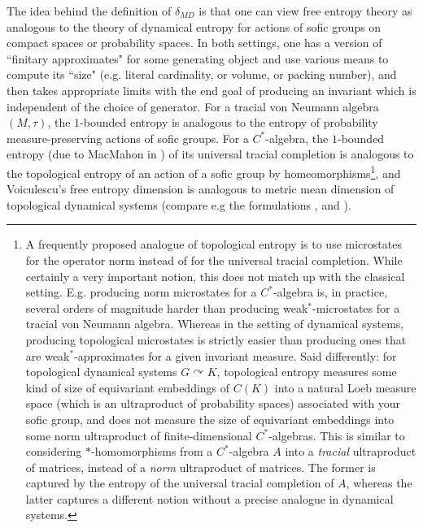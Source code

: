 \documentclass[10pt]{amsart}
\theoremstyle{definition}
\numberwithin{equation}{section}
\DeclareMathOperator{\actson}{\curvearrowright}
\begin{document}
The idea behind the definition of $\delta_{MD}$ is that one can view free entropy theory as analogous to the theory of dynamical entropy for actions of sofic groups on compact spaces or probability spaces. In both settings, one has a version of ``finitary approximates" for some generating object and use various means to compute its ``size" (e.g. literal cardinality, or volume, or packing number), and then takes appropriate limits with the end goal of producing an invariant which is independent of the choice of generator. For a tracial von Neumann algebra $(M,\tau)$, the $1$-bounded entropy is analogous to the entropy of probability measure-preserving actions of sofic groups. For a $C^{*}$-algebra, the $1$-bounded entropy (due to MacMahon in \cite{macmahon20261boundedentropycalgebras}) of its universal tracial completion is analogous to the topological entropy of an action of a sofic group by homeomorphisms\footnote{A frequently proposed analogue of topological entropy is to use microstates for the operator norm instead of for the universal tracial completion. While certainly a very important notion, this does not match up with the classical setting. E.g. producing norm microstates for a $C^{*}$-algebra is, in practice, several orders of magnitude harder than producing weak$^{*}$-microstates for a tracial von Neumann algebra. Whereas in the setting of dynamical systems, producing topological microstates is strictly easier than producing ones that are weak$^{*}$-approximates for a given invariant measure. Said differently: for topological dynamical systems $G\actson K$, topological entropy measures some kind of size of equivariant embeddings of $C(K)$ into a natural Loeb measure space (which is an ultraproduct of probability spaces) associated with your sofic group, and does not measure the size of equivariant embeddings into some norm ultraproduct of finite-dimensional $C^{*}$-algebras. This is similar to considering $*$-homomorphisms from a $C^{*}$-algebra $A$ into a \emph{tracial} ultraproduct of matrices, instead of a \emph{norm} ultraproduct of matrices. The former is captured by the entropy of the universal tracial completion of $A$, whereas the latter captures a different notion without a precise analogue in dynamical systems.}, and
Voiculescu's free entropy dimension is analogous to metric mean dimension of topological dynamical systems (compare e.g the formulations \cite[Section 4]{LindWeiss},\cite[Section 4]{Li}  and \cite[Definition 2.1]{JungLemma}). 
\end{document}
